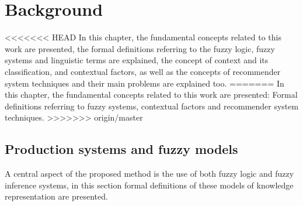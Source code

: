 \chapter{Background}\label{background}

<<<<<<< HEAD
In this chapter, the fundamental concepts related to this work are 
presented,  the formal definitions referring to the fuzzy logic, fuzzy 
systems and linguistic terms are explained, the concept of context 
and its classification, and contextual factors,  as well as the concepts
 of recommender system techniques and their main problems 
 are explained too.
=======
In this chapter, the fundamental concepts related to this work are presented:
Formal definitions referring to fuzzy systems, contextual factors and
recommender system techniques. 
>>>>>>> origin/master

\section{Production systems and fuzzy models}

A central aspect of the proposed method is the use of both fuzzy 
logic and fuzzy inference systems, in this section formal definitions 
of these models of knowledge representation are presented.  


